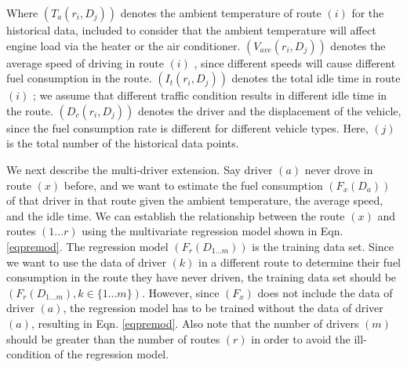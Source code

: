Where $(T_a(r_i,D_j))$  denotes the ambient temperature of route $(i)$ for the historical data, included to consider that the ambient temperature will affect engine load via the heater or the air conditioner. $(V_{ave}(r_i,D_j))$ denotes the average speed of driving in route $(i)$ , since different speeds will cause different fuel consumption in the route. $(I_{t}(r_i,D_j))$  denotes the total idle time in route $(i)$ ; we assume that different traffic condition results in different idle time in the route. $(D_{c}(r_i,D_j))$  denotes the driver and the displacement of the vehicle, since the fuel consumption rate is different for different vehicle types. Here, $(j)$ is the total number of the historical data points.
%

We next describe the multi-driver extension. 
Say driver $(a)$ never drove in route $(x)$ before, and we want to estimate the fuel consumption $(F_x(D_a))$ of that driver in that route given the ambient temperature, the average speed, and the idle time. We can establish the relationship between the route $(x)$  and routes $(1 \ldots r)$ using the multivariate regression model shown in Eqn. \ref{eqpremod}. The regression model $(F_r(D_{1 \ldots m}))$ is the training data set. Since we want to use the data of driver $(k)$ in a different route to determine their fuel consumption in the route they have never driven, the training data set should be $(F_r(D_{1 \ldots m}), k \in \{1 \ldots m\})$. However, since $(F_x)$  does not include the data of driver $(a)$, the regression model has to be trained without the data of driver $(a)$, resulting in Eqn. \ref{eqpremod}. Also note that the number of drivers $(m)$ should be greater than the number of routes $(r)$ in order to avoid the ill-condition of the regression model.

